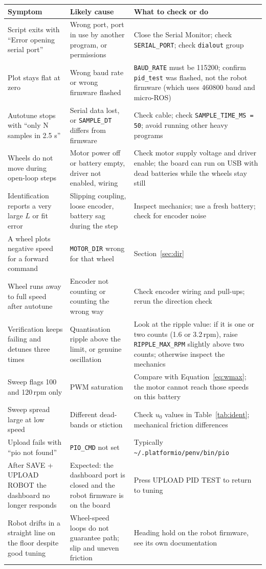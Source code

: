 \documentclass[11pt,a4paper]{report}
\newcommand{\code}[1]{\texttt{#1}}
\begin{document}
\begin{longtable}{@{}p{4.4cm}p{4.8cm}p{5.4cm}@{}}
\toprule
Symptom & Likely cause & What to check or do\\
\midrule
\endhead
Script exits with ``Error opening serial port'' & Wrong port, port in use by another program, or permissions & Close the Serial Monitor; check \code{SERIAL\_PORT}; check \code{dialout} group\\
Plot stays flat at zero & Wrong baud rate or wrong firmware flashed & \code{BAUD\_RATE} must be 115200; confirm \code{pid\_test} was flashed, not the robot firmware (which uses 460800 baud and micro-ROS)\\
Autotune stops with ``only N samples in 2.5 s'' & Serial data lost, or \code{SAMPLE\_DT} differs from firmware & Check cable; check \code{SAMPLE\_TIME\_MS = 50}; avoid running other heavy programs\\
Wheels do not move during open-loop steps & Motor power off or battery empty, driver not enabled, wiring & Check motor supply voltage and driver enable; the board can run on USB with dead batteries while the wheels stay still\\
Identification reports a very large $L$ or fit error & Slipping coupling, loose encoder, battery sag during the step & Inspect mechanics; use a fresh battery; check for encoder noise\\
A wheel plots negative speed for a forward command & \code{MOTOR\_DIR} wrong for that wheel & Section~\ref{sec:dir}\\
Wheel runs away to full speed after autotune & Encoder not counting or counting the wrong way & Check encoder wiring and pull-ups; rerun the direction check\\
Verification keeps failing and detunes three times & Quantisation ripple above the limit, or genuine oscillation & Look at the ripple value: if it is one or two counts (1.6 or 3.2\,rpm), raise \code{RIPPLE\_MAX\_RPM} slightly above two counts; otherwise inspect the mechanics\\
Sweep flags 100 and 120\,rpm only & PWM saturation & Compare with Equation~\eqref{eq:wmax}; the motor cannot reach those speeds on this battery\\
Sweep spread large at low speed & Different dead-bands or stiction & Check $u_0$ values in Table~\ref{tab:ident}; mechanical friction differences\\
Upload fails with ``pio not found'' & \code{PIO\_CMD} not set & Typically \code{\textasciitilde/.platformio/penv/bin/pio}\\
After SAVE + UPLOAD ROBOT the dashboard no longer responds & Expected: the dashboard port is closed and the robot firmware is on the board & Press UPLOAD PID TEST to return to tuning\\
Robot drifts in a straight line on the floor despite good tuning & Wheel-speed loops do not guarantee path; slip and uneven friction & Heading hold on the robot firmware, see its own documentation\\
\bottomrule
\end{longtable}
\end{document}
